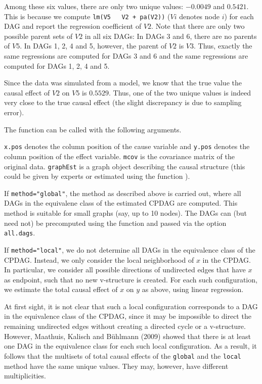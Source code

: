 \documentclass[article]{jss}
\begin{document}
Among these six values, there are only two unique values: $-0.0049$ and
$0.5421$. This is because we compute \texttt{lm(V5 ~ V2 + pa(V2))} ($Vi$
denotes node $i$) for each
DAG and report the regression coefficient of $V2$. Note that there are
only two possible parent sets of $V2$ in all six DAGs: In DAGs 3 and 6,
there are no parents of $V5$. In DAGs 1, 2, 4 and 5, however, the parent
of $V2$ is $V3$. Thus, exactly the same regressions are computed for
DAGs 3 and 6 and the same regressions are computed for DAGs 1, 2, 4 and 5.

Since the data was simulated from a model, we know that the true value the
causal effect of $V2$ on $V5$ is $0.5529$. Thus, one of the two unique values is
indeed very close to the true causal effect (the slight discrepancy is due
to sampling error). 

The function  can be called with the following arguments.


\texttt{x.pos} denotes the column position of the cause variable and
\texttt{y.pos} denotes the column position of the effect
variable. \texttt{mcov} is the covariance matrix of the original
data. \texttt{graphEst} is a graph object describing the causal structure
(this could be given by experts or estimated using the function ).

If \texttt{method="global"}, the method as described above is carried out,
where all DAGs in the equivalene class of the estimated CPDAG are
computed. This method is suitable for small graphs (say, up to 10
nodes). The DAGs can (but need not) be precomputed using the function
 and passed via the option \texttt{all.dags}.

If \texttt{method="local"}, we do not determine all DAGs in the equivalence
class of the CPDAG. Instead, we only consider the local neighborhood of $x$
in the CPDAG. In particular, we consider all possible directions of
undirected edges that have $x$ as endpoint, such that no new v-structure is
created. For each such configuration, we estimate the total causal effect
of $x$ on $y$ as above, using linear regression.

At first sight, it is not clear that such a local configuration corresponds
to a DAG in the equivalence class of the CPDAG, since it may be impossible
to direct the remaining undirected edges without creating a directed cycle
or a v-structure. However, Maathuis, Kalisch and B\"uhlmann (2009) showed
that there is at least one DAG in the equivalence class for each such local
configuration.  As a result, it follows that the multisets of total causal
effects of the \texttt{global} and the \texttt{local} method have the same unique
values. They may, however, have different multiplicities. 
\end{document}
